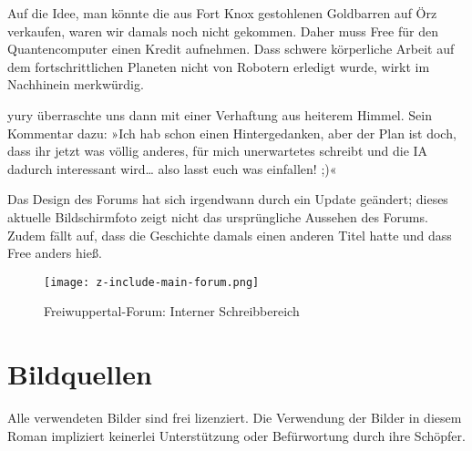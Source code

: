 Auf die Idee, man könnte die aus Fort Knox gestohlenen Goldbarren auf Örz verkaufen, waren wir damals noch nicht gekommen. Daher muss Free für den Quantencomputer einen Kredit aufnehmen. Dass schwere körperliche Arbeit auf dem fortschrittlichen Planeten nicht von Robotern erledigt wurde, wirkt im Nachhinein merkwürdig.

yury überraschte uns dann mit einer Verhaftung aus heiterem Himmel. Sein Kommentar dazu: »Ich hab schon einen Hintergedanken, aber der Plan ist doch, dass ihr jetzt was völlig anderes, für mich unerwartetes schreibt und die IA dadurch interessant wird… also lasst euch was einfallen! ;)«

Das Design des Forums hat sich irgendwann durch ein Update geändert; dieses aktuelle Bildschirmfoto zeigt nicht das ursprüngliche Aussehen des Forums. Zudem fällt auf, dass die Geschichte damals einen anderen Titel hatte und dass Free anders hieß.

\begin{figure}[p]
    \texttt{[image: z-include-main-forum.png]}
    \caption{Freiwuppertal-Forum: Interner Schreibbereich}
\end{figure}


\chapter{Bildquellen}

Alle verwendeten Bilder sind frei lizenziert. Die Verwendung der Bilder in diesem Roman impliziert keinerlei Unterstützung oder Befürwortung durch ihre Schöpfer.

